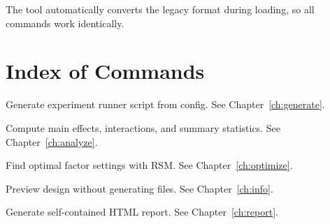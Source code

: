 \documentclass[11pt]{book}
\begin{document}
The tool automatically converts the legacy format during loading, so all commands work identically.


\backmatter

\chapter*{Index of Commands}

\begin{description}[style=nextline, labelwidth=4cm]
  \item[\texttt{doe generate}] Generate experiment runner script from config. See Chapter~\ref{ch:generate}.
  \item[\texttt{doe analyze}] Compute main effects, interactions, and summary statistics. See Chapter~\ref{ch:analyze}.
  \item[\texttt{doe optimize}] Find optimal factor settings with RSM. See Chapter~\ref{ch:optimize}.
  \item[\texttt{doe info}] Preview design without generating files. See Chapter~\ref{ch:info}.
  \item[\texttt{doe report}] Generate self-contained HTML report. See Chapter~\ref{ch:report}.
\end{description}
\end{document}
